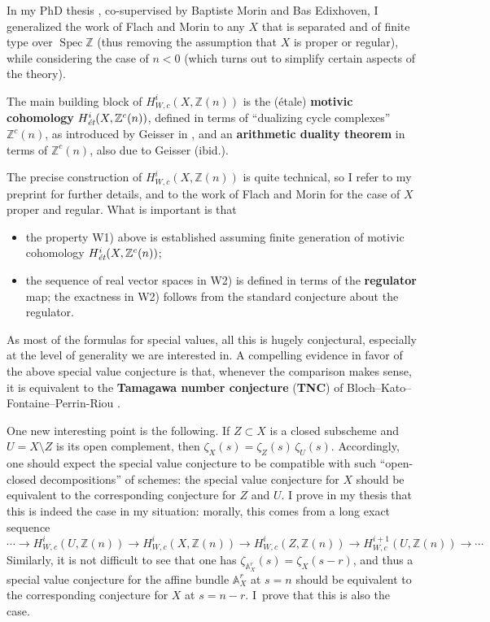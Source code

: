 \documentclass{article}
\DeclareMathOperator{\Spec}{Spec}
\newcommand{\ZZ}{\mathbb{Z}}
\renewcommand{\AA}{\mathbb{A}}
\begin{document}
In my PhD thesis \cite{These}, co-supervised by Baptiste Morin and Bas
Edixhoven, I generalized the work of Flach and Morin to any $X$ that is
separated and of finite type over $\Spec \ZZ$ (thus removing the assumption that
$X$ is proper or regular), while considering the case of $n < 0$
(which turns out to simplify certain aspects of the theory).

The main building block of $H^i_{W,c} (X,\ZZ(n))$ is the (étale)
\textbf{motivic cohomology} $H^i_\text{\it ét} (X, \ZZ^c (n))$, defined in terms
of ``dualizing cycle complexes'' $\ZZ^c (n)$, as introduced by Geisser in
\cite{Geisser-2010}, and an \textbf{arithmetic duality theorem} in terms of
$\ZZ^c (n)$, also due to Geisser (ibid.).

The precise construction of $H^i_{W,c} (X,\ZZ(n))$ is quite technical, so I
refer to my preprint \cite{Weil-etale-preprint-1} for further details, and to
the work of Flach and Morin \cite{Flach-Morin-2018} for the case of $X$ proper
and regular. What is important is that
\begin{itemize}
\item the property W1) above is established assuming finite generation of
  motivic cohomology $H^i_\text{\it ét} (X, \ZZ^c (n))$;

\item the sequence of real vector spaces in W2) is defined in terms of the
  \textbf{regulator} map; the exactness in W2) follows from the standard
  conjecture about the regulator.
\end{itemize}


As most of the formulas for special values, all this is hugely conjectural,
especially at the level of generality we are interested in. A compelling
evidence in favor of the above special value conjecture is that, whenever the
comparison makes sense, it is equivalent to the \textbf{Tamagawa number
  conjecture} (\textbf{TNC}) of Bloch--Kato--Fontaine--Perrin-Riou
\cite{Fontaine-Perrin-Riou}.

One new interesting point is the following. If $Z \subset X$ is a closed
subscheme and $U = X\setminus Z$ is its open complement, then
$\zeta_X (s) = \zeta_Z (s) \, \zeta_U (s)$. Accordingly, one should expect the
special value conjecture to be compatible with such ``open-closed
decompositions'' of schemes: the special value conjecture for $X$ should be
equivalent to the corresponding conjecture for $Z$ and $U$. I prove in my
thesis that this is indeed the case in my situation: morally, this comes from a
long exact sequence
\[ \cdots \to H^i_{W,c} (U,\ZZ(n)) \to H^i_{W,c} (X,\ZZ(n)) \to H^i_{W,c} (Z,\ZZ(n)) \to H^{i+1}_{W,c} (U,\ZZ(n)) \to \cdots \]
Similarly, it is not difficult to see that one has
$\zeta_{\AA^r_X} (s) = \zeta_X (s-r)$, and thus a special value conjecture for
the affine bundle $\AA^r_X$ at $s = n$ should be equivalent to the corresponding
conjecture for $X$ at $s = n-r$. I~prove that this is also the case.
\end{document}
